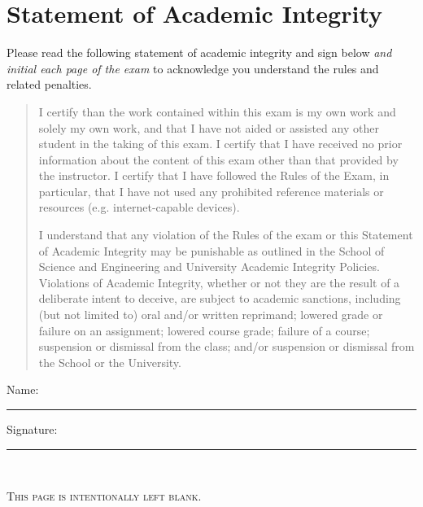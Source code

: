 		\section*{Statement of Academic Integrity}
		Please read the following statement of academic integrity and sign below \emph{and initial each page of the exam} to acknowledge you understand the rules and related penalties.
		\begin{quote}
			I certify than the work contained within this exam is my own work and solely my own work, and that I have not aided or assisted any other student in the taking of this exam.  I certify that I have received no prior information about the content of this exam other than that provided by the instructor.  I certify that I have followed the Rules of the Exam, in particular, that I have not used any prohibited reference materials or resources (e.g. internet-capable devices).

			I understand that any violation of the Rules of the exam or this Statement of Academic Integrity may be punishable as outlined in the School of Science and Engineering and University Academic Integrity Policies.  Violations of Academic Integrity, whether or not they are the result of a deliberate intent to deceive, are subject to academic sanctions, including (but not limited to) oral and/or written reprimand; lowered grade or failure on an assignment; lowered course grade; failure of a course; suspension or dismissal from the class; and/or suspension or dismissal from the School or the University.
		\end{quote}
		\vspace{0.25in}
		\begin{center}
			Name: \rule{2.0in}{1pt} \hspace{1cm} Signature: \rule{2.0in}{1pt}\\
		\end{center}
    \newpage{}
    \begin{center}
        \textsc{This page is intentionally left blank.}
    \end{center}
	\newpage{}

\fi
